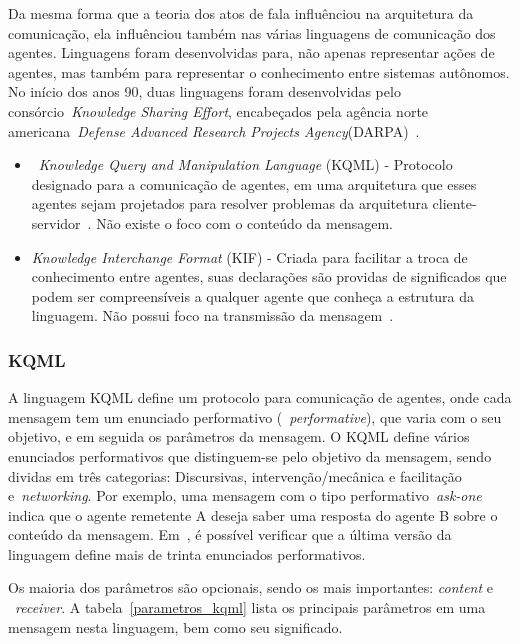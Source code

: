 Da mesma forma que a teoria dos atos de fala influênciou na arquitetura da comunicação, ela influênciou também nas várias linguagens de comunicação dos agentes. Linguagens foram desenvolvidas para, não apenas representar ações de agentes, mas também para representar o conhecimento entre sistemas autônomos. No início dos anos 90, duas linguagens foram desenvolvidas pelo consórcio~\emph{Knowledge Sharing Effort}, encabeçados pela agência norte americana~\emph{Defense Advanced Research Projects Agency}(DARPA)~\cite{kse}.
\begin{itemize}
	\item ~\emph{Knowledge Query and Manipulation Language} (KQML) - Protocolo designado para a comunicação de agentes, em uma arquitetura que esses agentes sejam projetados para resolver problemas da arquitetura cliente-servidor~\cite{preece1997}. Não existe o foco com o conteúdo da mensagem.
	\item \emph{Knowledge Interchange Format} (KIF) - Criada para facilitar a troca de conhecimento entre agentes, suas declarações são providas de significados que podem ser compreensíveis a qualquer agente que conheça a estrutura da linguagem. Não possui foco na transmissão da mensagem~\cite{kifmanual}.
\end{itemize}

\subsubsection{KQML}

A linguagem KQML define um protocolo para comunicação de agentes, onde cada mensagem tem um enunciado performativo (~\emph{performative}), que varia com o seu objetivo, e em seguida os parâmetros da mensagem. O KQML define vários enunciados performativos que distinguem-se pelo objetivo da mensagem, sendo dividas em três categorias: Discursivas, intervenção/mecânica e facilitação e~\emph{networking}. Por exemplo, uma mensagem com o tipo performativo~\emph{ask-one} indica que o agente remetente A deseja saber uma resposta do agente B sobre o conteúdo da mensagem. Em~\cite{preece1997}, é possível verificar que a última versão da linguagem define mais de trinta enunciados performativos.

Os maioria dos parâmetros são opcionais, sendo os mais importantes: \emph{content} e ~\emph{receiver}. A tabela~\ref{parametros_kqml} lista os principais parâmetros em uma mensagem nesta linguagem, bem como seu significado.

